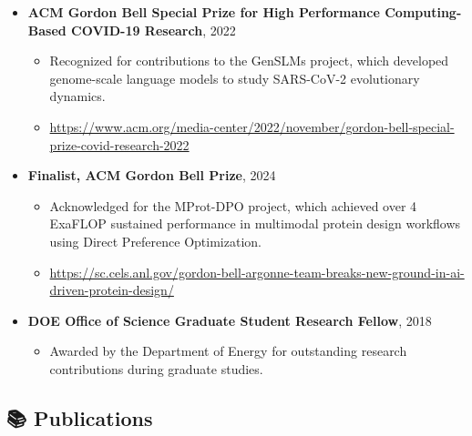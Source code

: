 \documentclass[
  letterpaper,
  DIV=11,
  numbers=noendperiod]{scrartcl}
\providecommand{\tightlist}{%
  \setlength{\itemsep}{0pt}\setlength{\parskip}{0pt}}\usepackage{longtable,booktabs,array}
\begin{document}
\begin{itemize}
\tightlist
\item
  \textbf{ACM Gordon Bell Special Prize for High Performance
  Computing-Based COVID-19 Research}, 2022

  \begin{itemize}
  \tightlist
  \item
    Recognized for contributions to the GenSLMs project, which developed
    genome-scale language models to study SARS-CoV-2 evolutionary
    dynamics.
  \item
    \url{https://www.acm.org/media-center/2022/november/gordon-bell-special-prize-covid-research-2022}
  \end{itemize}
\item
  \textbf{Finalist, ACM Gordon Bell Prize}, 2024

  \begin{itemize}
  \tightlist
  \item
    Acknowledged for the MProt-DPO project, which achieved over 4
    ExaFLOP sustained performance in multimodal protein design workflows
    using Direct Preference Optimization.
  \item
    \url{https://sc.cels.anl.gov/gordon-bell-argonne-team-breaks-new-ground-in-ai-driven-protein-design/}
  \end{itemize}
\item
  \textbf{DOE Office of Science Graduate Student Research Fellow}, 2018

  \begin{itemize}
  \tightlist
  \item
    Awarded by the Department of Energy for outstanding research
    contributions during graduate studies.
  \end{itemize}
\end{itemize}

\subsection{📚 Publications}\label{publications}
\end{document}
